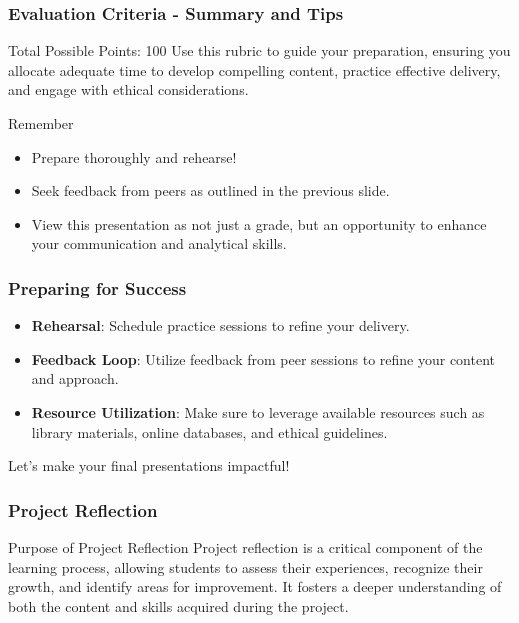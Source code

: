 \documentclass[aspectratio=169]{beamer}
\begin{document}
\begin{frame}[fragile]
    \frametitle{Evaluation Criteria - Summary and Tips}
    \begin{block}{Total Possible Points: 100}
        Use this rubric to guide your preparation, ensuring you allocate adequate time to develop compelling content, practice effective delivery, and engage with ethical considerations.
    \end{block}

    \begin{block}{Remember}
        \begin{itemize}
            \item Prepare thoroughly and rehearse!
            \item Seek feedback from peers as outlined in the previous slide.
            \item View this presentation as not just a grade, but an opportunity to enhance your communication and analytical skills.
        \end{itemize}
    \end{block}
\end{frame}

\begin{frame}[fragile]
    \frametitle{Preparing for Success}
    \begin{itemize}
        \item \textbf{Rehearsal}: Schedule practice sessions to refine your delivery.
        \item \textbf{Feedback Loop}: Utilize feedback from peer sessions to refine your content and approach.
        \item \textbf{Resource Utilization}: Make sure to leverage available resources such as library materials, online databases, and ethical guidelines.
    \end{itemize}
    Let's make your final presentations impactful!
\end{frame}

\begin{frame}[fragile]
    \frametitle{Project Reflection}
    \begin{block}{Purpose of Project Reflection}
        Project reflection is a critical component of the learning process, allowing students to assess their experiences, recognize their growth, and identify areas for improvement. It fosters a deeper understanding of both the content and skills acquired during the project.
    \end{block}
\end{frame}
\end{document}
